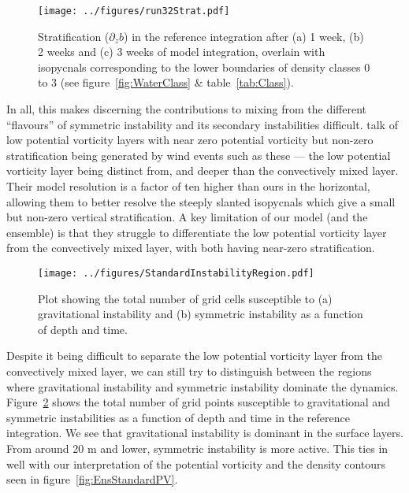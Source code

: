
\begin{figure}[t]
    \centering
    \texttt{[image: ../figures/run32Strat.pdf]}
    \caption{Stratification ($\partial_z b$) in the reference integration after (a) 1 week, (b) 2 weeks and (c) 3 weeks of model integration, overlain with isopycnals corresponding to the lower boundaries of density classes 0 to 3 (see figure~\ref{fig:WaterClass} \& table~\ref{tab:Class}).}
    \label{fig:EnsStandardStrat}
\end{figure}

In all, this makes discerning the contributions to mixing from the different ``flavours'' of symmetric instability and its secondary instabilities difficult. \citet{Taylor2010} talk of low potential vorticity layers with near zero potential vorticity but non-zero stratification being generated by wind events such as these --- the low potential vorticity layer being distinct from, and deeper than the convectively mixed layer. Their model resolution is a factor of ten higher than ours in the horizontal, allowing them to better resolve the steeply slanted isopycnals which give a small but non-zero vertical stratification. A key limitation of our model (and the ensemble) is that they struggle to differentiate the low potential vorticity layer from the convectively mixed layer, with both having near-zero stratification.

\begin{figure}[t]
    \centering
    \texttt{[image: ../figures/StandardInstabilityRegion.pdf]}
    \caption{Plot showing the total number of grid cells susceptible to (a) gravitational instability and (b) symmetric instability as a function of depth and time.}
    \label{fig:GravVsSym}
\end{figure}

Despite it being difficult to separate the low potential vorticity layer from the convectively mixed layer, we can still try to distinguish between the regions where gravitational instability and symmetric instability dominate the dynamics. Figure~\ref{fig:GravVsSym} shows the total number of grid points susceptible to gravitational and symmetric instabilities as a function of depth and time in the reference integration. We see that gravitational instability is dominant in the surface layers. From around 20 m and lower, symmetric instability is more active. This ties in well with our interpretation of the potential vorticity and the density contours seen in figure~\ref{fig:EnsStandardPV}.

